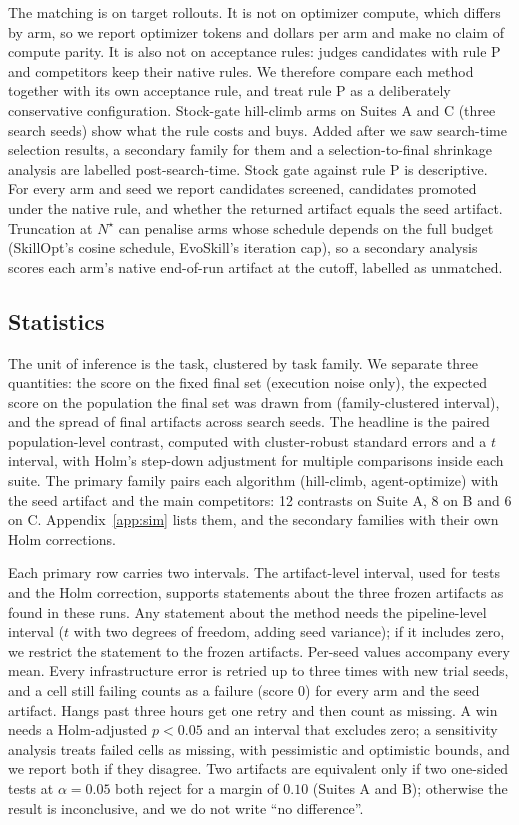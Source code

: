The matching is on target rollouts. It is not on optimizer compute, which differs by arm, so we report optimizer tokens and dollars per arm and make no claim of compute parity. It is also not on acceptance rules: \capevolve{} judges candidates with rule P and competitors keep their native rules. We therefore compare each method together with its own acceptance rule, and treat rule P as a deliberately conservative configuration. Stock-gate hill-climb arms on Suites A and C (three search seeds) show what the rule costs and buys. Added after we saw search-time selection results, a secondary family for them and a selection-to-final shrinkage analysis are labelled post-search-time. Stock gate against rule P is descriptive. For every arm and seed we report candidates screened, candidates promoted under the native rule, and whether the returned artifact equals the seed artifact. Truncation at $N^\star$ can penalise arms whose schedule depends on the full budget (SkillOpt's cosine schedule, EvoSkill's iteration cap), so a secondary analysis scores each arm's native end-of-run artifact at the cutoff, labelled as unmatched.

\subsection{Statistics}
\label{sec:setup:stats}

The unit of inference is the task, clustered by task family. We separate three quantities: the score on the fixed final set (execution noise only), the expected score on the population the final set was drawn from (family-clustered interval), and the spread of final artifacts across search seeds. The headline is the paired population-level contrast, computed with cluster-robust standard errors and a $t$ interval, with Holm's step-down adjustment for multiple comparisons inside each suite. The primary family pairs each \capevolve{} algorithm (hill-climb, agent-optimize) with the seed artifact and the main competitors: 12 contrasts on Suite A, 8 on B and 6 on C. Appendix~\ref{app:sim} lists them, and the secondary families with their own Holm corrections.

Each primary row carries two intervals. The artifact-level interval, used for tests and the Holm correction, supports statements about the three frozen artifacts as found in these runs. Any statement about the method needs the pipeline-level interval ($t$ with two degrees of freedom, adding seed variance); if it includes zero, we restrict the statement to the frozen artifacts. Per-seed values accompany every mean. Every infrastructure error is retried up to three times with new trial seeds, and a cell still failing counts as a failure (score 0) for every arm and the seed artifact. Hangs past three hours get one retry and then count as missing. A win needs a Holm-adjusted $p<0.05$ and an interval that excludes zero; a sensitivity analysis treats failed cells as missing, with pessimistic and optimistic bounds, and we report both if they disagree. Two artifacts are equivalent only if two one-sided tests at $\alpha=0.05$ both reject for a margin of $0.10$ (Suites A and B); otherwise the result is inconclusive, and we do not write ``no difference''.

